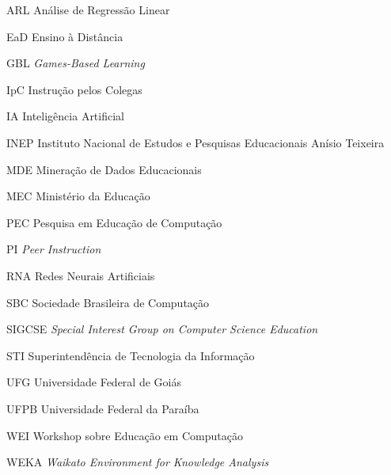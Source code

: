 \documentclass[
	12pt,				%
	oneside,
	a4paper,			%
    sumario=tradicional,%
	chapter=TITLE,		%
	english,			%
	french,				%
	spanish,			%
	brazil,				%
	]{abntex2}
\begin{document}
\listoffigures*
\cleardoublepage

\listoftables*
\cleardoublepage

\begin{siglas}

  \item[ARL] Análise de Regressão Linear
  \item[EaD] Ensino à Distância
  \item[GBL] \textit{Games-Based Learning}
  \item[IpC] Instrução pelos Colegas
  \item[IA] Inteligência Artificial
  \item[INEP] Instituto Nacional de Estudos e Pesquisas Educacionais Anísio Teixeira
  \item[MDE] Mineração de Dados Educacionais
  \item[MEC] Ministério da Educação
  \item[PEC] Pesquisa em Educação de Computação
  \item[PI] \textit{Peer Instruction}
  \item[RNA] Redes Neurais Artificiais
\item[SBC]	Sociedade Brasileira de Computação
  \item[SIGCSE] \textit{Special Interest Group on Computer Science Education}
  \item[STI] Superintendência de Tecnologia da Informação
  \item[UFG] Universidade Federal de Goiás
  \item[UFPB] Universidade Federal da Paraíba
  \item[WEI] Workshop sobre Educação em Computação
  \item[WEKA] \textit{Waikato Environment for Knowledge Analysis}



\end{siglas}

\end{document}
